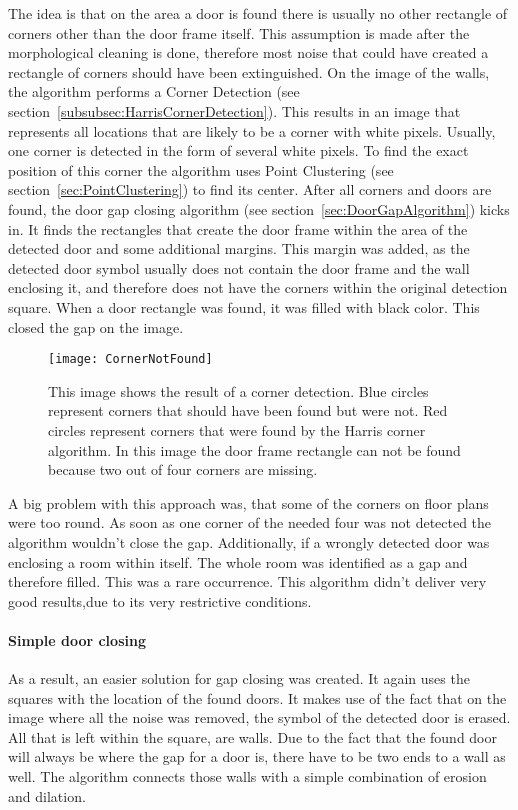 The idea is that on the area a door is found there is usually no other rectangle of corners other than the door frame itself. This assumption is made after the morphological cleaning is done, therefore most noise that could have created a rectangle of corners should have been extinguished. On the image of the walls, the algorithm performs a Corner Detection (see section~\ref{subsubsec:HarrisCornerDetection}). This results in an image that represents all locations that are likely to be a corner with white pixels. Usually, one corner is detected in the form of several white pixels. To find the exact position of this corner the algorithm uses Point Clustering (see section~\ref{sec:PointClustering}) to find its center. After all corners and doors are found, the door gap closing algorithm (see section~\ref{sec:DoorGapAlgorithm}) kicks in. It finds the rectangles that create the door frame within the area of the detected door and some additional margins. This margin was added, as the detected door symbol usually does not contain the door frame and the wall enclosing it, and therefore does not have the corners within the original detection square.
When a door rectangle was found, it was filled with black color. This closed the gap on the image.

\begin{figure}[H]
	\centering
	\texttt{[image: CornerNotFound]}
	\caption{This image shows the result of a corner detection. Blue circles represent corners that should have been found but were not. Red circles represent corners that were found by the Harris corner algorithm. In this image the door frame rectangle can not be found because two out of four corners are missing.}
	\label{fig:CornerNotFound}
\end{figure}

A big problem with this approach was, that some of the corners on floor plans were too round. As soon as one corner of the needed four was not detected the algorithm wouldn't close the gap. Additionally, if a wrongly detected door was enclosing a room within itself. The whole room was identified as a gap and therefore filled. This was a rare occurrence. This algorithm didn't deliver very good results,due to its very restrictive conditions.

\paragraph{Simple door closing}
\label{sub:SimpleDoorClosing}
As a result, an easier solution for gap closing was created. It again uses the squares with the location of the found doors. It makes use of the fact that on the image where all the noise was removed, the symbol of the detected door is erased. All that is left within the square, are walls. Due to the fact that the found door will always be where the gap for a door is, there have to be two ends to a wall as well. The algorithm connects those walls with a simple combination of erosion and dilation.

